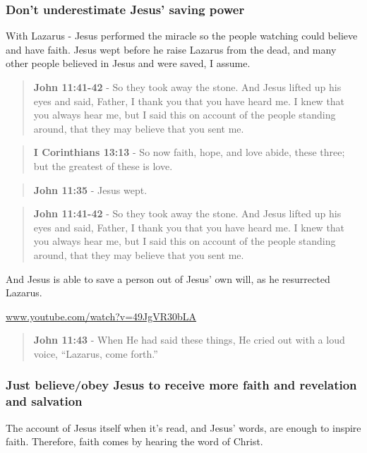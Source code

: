 \documentclass[11pt]{article}
\begin{document}
\subsubsection{Don't underestimate Jesus' saving power}
\label{sec:orge39dee9}

With Lazarus - Jesus performed the miracle so the people watching could believe and have faith.
Jesus wept before he raise Lazarus from the dead, and many other people believed in Jesus and were saved, I assume.

\begin{quote}
\textbf{John 11:41-42} - So they took away the stone. And Jesus lifted up his eyes and said, Father, I thank you that you have heard me. I knew that you always hear me, but I said this on account of the people standing around, that they may believe that you sent me.
\end{quote}

\begin{quote}
\textbf{I Corinthians 13:13} - So now faith, hope, and love abide, these three; but the greatest of these is love.
\end{quote}

\begin{quote}
\textbf{John 11:35} - Jesus wept.
\end{quote}

\begin{quote}
\textbf{John 11:41-42} - So they took away the stone. And Jesus lifted up his eyes and said, Father, I thank you that you have heard me. I knew that you always hear me, but I said this on account of the people standing around, that they may believe that you sent me.
\end{quote}

And Jesus is able to save a person out of Jesus' own will, as he resurrected Lazarus.

\href{https://www.youtube.com/watch?v=49JgVR30bLA}{www.youtube.com/watch?v=49JgVR30bLA}

\begin{quote}
\textbf{John 11:43} - When He had said these things, He cried out with a loud voice, “Lazarus, come forth.”
\end{quote}

\subsubsection{Just believe/obey Jesus to receive more faith and revelation and salvation}
\label{sec:org73a6b4f}
The account of Jesus itself when it's read, and Jesus' words, are enough to inspire faith. Therefore, faith comes by hearing the word of Christ.
\end{document}
